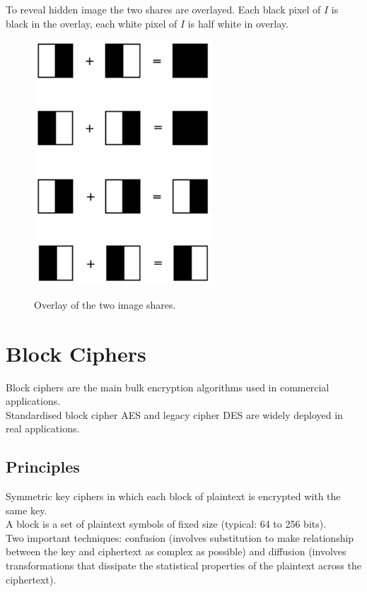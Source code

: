 \documentclass{article}
\begin{document}
To reveal hidden image the two shares are overlayed. Each black pixel of $I$ is black in the overlay, each white pixel of $I$ is half white in overlay.
\begin{figure}[H]
\centering
\includegraphics[scale=0.45]{Images/overlay.png}
\label{fig:subpixel}
\caption{Overlay of the two image shares.}
\end{figure}


\newpage \section{Block Ciphers}

Block ciphers are the main bulk encryption algorithms used in commercial applications.\\
Standardised block cipher AES and legacy cipher DES are widely deployed in real applications.

\subsection{Principles}

Symmetric key ciphers in which each block of plaintext is encrypted with the same key.\\
A block is a set of plaintext symbols of fixed size (typical: 64 to 256 bits).\\
Two important techniques: confusion (involves substitution to make relationship between the key and ciphertext as complex as possible) and diffusion (involves transformations that dissipate the statistical properties of the plaintext across the ciphertext). \\
\end{document}
